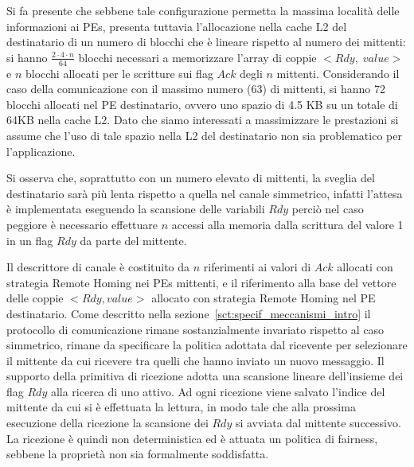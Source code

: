 Si fa presente che sebbene tale configurazione permetta la massima localit\`a delle informazioni ai PEs, presenta tuttavia l'allocazione nella cache L2 del destinatario di un numero di blocchi che \`e lineare rispetto al numero dei mittenti: si hanno $\frac{2 \cdot 4 \cdot n}{64}$ blocchi necessari a memorizzare l'array di coppie $<Rdy,\;value>$ e $n$ blocchi allocati per le scritture sui flag $Ack$ degli $n$ mittenti. Considerando il caso della comunicazione con il massimo numero (63) di mittenti, si hanno 72 blocchi allocati nel PE destinatario, ovvero uno spazio di 4.5 KB su un totale di 64KB nella cache L2. Dato che siamo interessati a massimizzare le prestazioni si assume che l'uso di tale spazio nella L2 del destinatario non sia problematico per l'applicazione. 

Si osserva che, soprattutto con un numero elevato di mittenti, la sveglia del destinatario sar\`a pi\`u lenta rispetto a quella nel canale simmetrico, infatti l'attesa \`e implementata eseguendo la scansione delle variabili $Rdy$ perci\`o nel caso peggiore \`e necessario effettuare $n$ accessi alla memoria dalla scrittura del valore 1 in un flag $Rdy$ da parte del mittente.

Il descrittore di canale \`e costituito da $n$ riferimenti ai valori di $Ack$ allocati con strategia Remote Homing nei PEs mittenti, e il riferimento alla base del vettore delle coppie $<Rdy, value>$ allocato con strategia Remote Homing nel PE destinatario. Come descritto nella sezione~\ref{sct:specif_meccanismi_intro} il protocollo di comunicazione rimane sosta\-nzialmente invariato rispetto al caso simmetrico, rimane da specificare la politica adottata dal ricevente per selezionare il mittente da cui ricevere tra quelli che hanno inviato un nuovo messaggio. Il supporto della primitiva di ricezione adotta una scansione lineare dell'insieme dei flag $Rdy$ alla ricerca di uno attivo. Ad ogni ricezione viene salvato l'indice del mittente da cui si \`e effettuata la lettura, in modo tale che alla prossima esecuzione della ricezione la scansione dei $Rdy$ si avviata dal mittente successivo. La ricezione \`e quindi non deterministica ed \`e attuata un politica di fairness, sebbene la propriet\`a non sia formalmente soddisfatta. 

